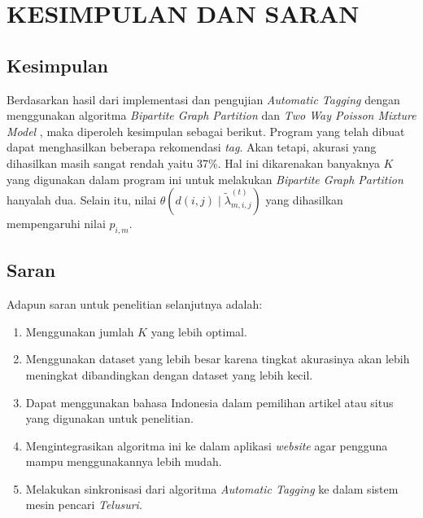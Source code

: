 
\chapter{KESIMPULAN DAN SARAN}

\section{Kesimpulan}
Berdasarkan hasil dari implementasi dan pengujian \textit{Automatic Tagging} dengan 
menggunakan algoritma \textit{Bipartite Graph Partition} dan \textit{Two Way Poisson Mixture Model}
, maka diperoleh kesimpulan sebagai berikut. Program yang telah dibuat dapat menghasilkan beberapa rekomendasi \textit{tag}.
Akan tetapi, akurasi yang dihasilkan masih sangat rendah yaitu 37\%. Hal ini dikarenakan banyaknya $K$ yang digunakan dalam program ini
untuk melakukan \textit{Bipartite Graph Partition} hanyalah dua. Selain itu, nilai  $\theta \left(d(i, j) \mid \tilde{\lambda}_{m, i, j}^{(t)}\right)$
yang dihasilkan mempengaruhi nilai $p_{i,m}$.

\section{Saran}
Adapun saran untuk penelitian selanjutnya adalah:
\begin{enumerate} 
	\item Menggunakan jumlah $K$ yang lebih optimal.
	\item Menggunakan dataset yang lebih besar karena tingkat akurasinya 
	akan lebih meningkat dibandingkan dengan dataset yang lebih kecil.
	\item Dapat menggunakan bahasa Indonesia dalam pemilihan artikel atau situs 
	yang digunakan untuk penelitian. 
	\item Mengintegrasikan algoritma ini ke dalam aplikasi \textit{website} agar 
	pengguna mampu menggunakannya lebih mudah.
	\item Melakukan sinkronisasi dari algoritma \textit{Automatic Tagging} ke dalam 
	sistem mesin pencari \textit{Telusuri}.
\end{enumerate}


\begin{comment}

\end{comment}
